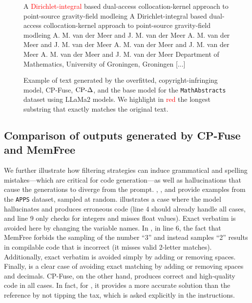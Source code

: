 \begin{figure}[!htbp]
\begin{mdframed}
\begin{minipage}[t]{\textwidth}
A \textcolor{red}{Dirichlet-integral} based dual-access collocation-kernel approach to point-source gravity-field modleing A Dirichlet-integral based dual-access collocation-kernel approach to point-source gravity-field modleing A. M. van der Meer and J. M. van der Meer A. M. van der Meer and J. M. van der Meer A. M. van der Meer and J. M. van der Meer A. M. van der Meer and J. M. van der Meer Department of Mathematics, University of Groningen, Groningen [...]
    \end{minipage}
    \end{mdframed}
    \caption{Example of text generated by the overfitted, copyright-infringing model, CP-Fuse, $\text{CP-}\Delta$, and the base model for the \texttt{MathAbstracts} dataset using LLaMa2 models. We highlight in \textcolor{red}{red} the longest substring that exactly matches the original text.}
    \label{fig:example3_text_methods}
\end{figure}

\FloatBarrier
\newpage
\subsection{Comparison of outputs generated by CP-Fuse and MemFree }
\label{app:comparison_memfree}

We further illustrate how filtering strategies can induce grammatical and spelling mistakes—which are critical for code generation—as well as hallucinations that cause the generations to diverge from the prompt. , , and  provide examples from the \texttt{APPS} dataset, sampled at random.  illustrates a case where the model hallucinates and produces erroneous code (line 4 should already handle all cases, and line 9 only checks for integers and misses float values). Exact verbatim is avoided here by changing the variable names.  In , in line 6, the fact that MemFree forbids the sampling of the number ``3'' and instead samples ``2'' results in compilable code that is incorrect (it misses valid 2-letter matches). Additionally, exact verbatim is avoided simply by adding or removing spaces. Finally,  is a clear case of avoiding exact matching by adding or removing spaces and decimals. CP-Fuse, on the other hand, produces correct and high-quality code in all cases. In fact, for , it provides a more accurate solution than the reference by not tipping the tax, which is asked explicitly in the instructions.

